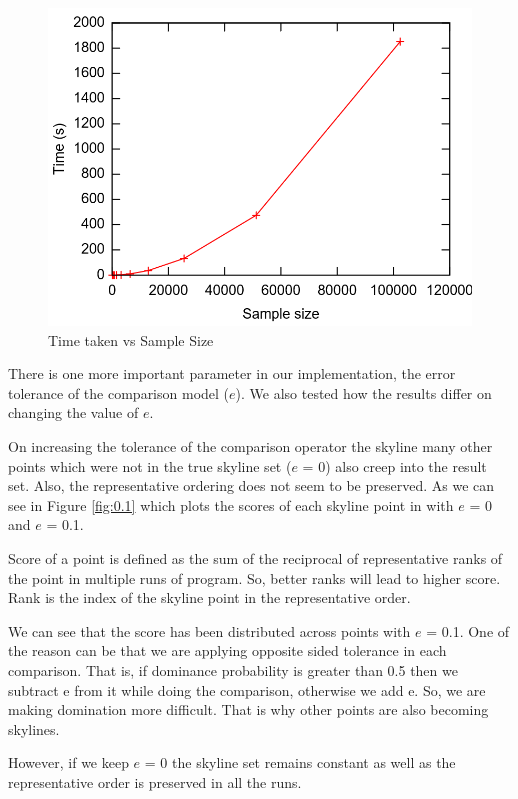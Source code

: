 \documentclass[twocolumn]{article}
\begin{document}
\begin{figure}[t]
	\centering
	\includegraphics[width=0.98\columnwidth]{time.png}
	\caption{Time taken vs Sample Size}
	\label{fig:time}
\end{figure}

There is one more important parameter in our implementation, the error tolerance of the comparison model ($e$). We also tested how the results differ on changing the value of $e$. 

On increasing the tolerance of the comparison operator the skyline many other points which were not in the true skyline set ($e$ = 0) also creep into the result set. Also, the representative ordering does not seem to be preserved. As we can see in Figure \ref{fig:0.1} which plots the scores of each skyline point in with $e$ = 0 and $e$ = 0.1.

Score of a point is defined as the sum of the reciprocal of representative ranks of the point in multiple runs of program. So, better ranks will lead to higher score. Rank is the index of the skyline point in the representative order. 

We can see that the score has been distributed across points with $e$ = 0.1. One of the reason can be that we are applying opposite sided tolerance in each comparison. That is, if dominance probability is greater than 0.5 then we subtract e from it while doing the comparison, otherwise we add e. So, we are making domination more difficult. That is why other points are also becoming skylines.

However, if we keep $e$ = 0 the skyline set remains constant as well as the representative order is preserved in all the runs. 
\end{document}
